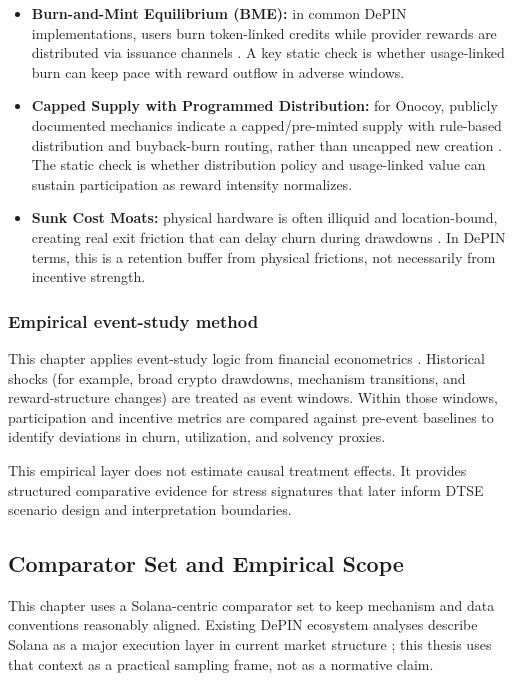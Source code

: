 \begin{itemize}
    \item \textbf{Burn-and-Mint Equilibrium (BME):} in common DePIN implementations, users burn token-linked credits while provider rewards are distributed via issuance channels \cite{RenderBME}. A key static check is whether usage-linked burn can keep pace with reward outflow in adverse windows.
    \item \textbf{Capped Supply with Programmed Distribution:} for Onocoy, publicly documented mechanics indicate a capped/pre-minted supply with rule-based distribution and buyback-burn routing, rather than uncapped new creation \cite{OnocoyWhitepaper301, OnocoyToken, OnocoyRewards, OnocoyBonus}. The static check is whether distribution policy and usage-linked value can sustain participation as reward intensity normalizes.
    \item \textbf{Sunk Cost Moats:} physical hardware is often illiquid and location-bound, creating real exit friction that can delay churn during drawdowns \cite{Arthur1989, Ballandies2023}. In DePIN terms, this is a retention buffer from physical frictions, not necessarily from incentive strength.
\end{itemize}

\subsubsection{Empirical event-study method}
This chapter applies event-study logic from financial econometrics \cite{MacKinlay1997}. Historical shocks (for example, broad crypto drawdowns, mechanism transitions, and reward-structure changes) are treated as event windows. Within those windows, participation and incentive metrics are compared against pre-event baselines to identify deviations in churn, utilization, and solvency proxies.

This empirical layer does not estimate causal treatment effects. It provides structured comparative evidence for stress signatures that later inform DTSE scenario design and interpretation boundaries.

\subsection{Comparator Set and Empirical Scope}
This chapter uses a Solana-centric comparator set to keep mechanism and data conventions reasonably aligned. Existing DePIN ecosystem analyses describe Solana as a major execution layer in current market structure \cite{FrontiersDePIN2025, Messari2024}; this thesis uses that context as a practical sampling frame, not as a normative claim.

